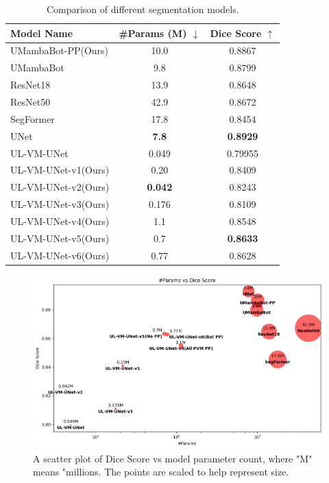 \documentclass[conference]{IEEEtran}
\begin{document}
\renewcommand{\arraystretch}{1.25}
\begin{table}[ht]
    \centering
    \captionsetup{skip=6pt}
    \begin{tabular}{|l|c|c|}
        \hline
        \textbf{Model Name} & \textbf{\#Params (M) $\downarrow$} & \textbf{Dice Score $\uparrow$} \\
        \hline
        UMambaBot-PP(Ours) & 10.0 & 0.8867 \\
        UMambaBot & 9.8 & 0.8799 \\
        ResNet18 & 13.9 & 0.8648 \\
        ResNet50 & 42.9 & 0.8672 \\
        SegFormer & 17.8 & 0.8454 \\
        UNet & \textbf{7.8} & \textbf{0.8929} \\
        \hline\hline
        UL-VM-UNet & 0.049 & 0.79955 \\
        UL-VM-UNet-v1(Ours) & 0.20 & 0.8409 \\
        UL-VM-UNet-v2(Ours) & \textbf{0.042} & 0.8243 \\
        UL-VM-UNet-v3(Ours) & 0.176 & 0.8109 \\
        UL-VM-UNet-v4(Ours) & 1.1 & 0.8548 \\
        UL-VM-UNet-v5(Ours) & 0.7 & \textbf{0.8633} \\
        UL-VM-UNet-v6(Ours) & 0.77 & 0.8628 \\
        \hline
    \end{tabular}
    \caption{Comparison of different segmentation models.}
    \label{tab:model_comparison}
\end{table}


\begin{figure}[!t]
    \centering
    \includegraphics[width=\columnwidth]{imgs/balls.png}
    \caption{A scatter plot of Dice Score vs model parameter count, where "M" means "millions. The points are scaled to help represent size.}
    \label{fig:balls}
\end{figure}
\end{document}
